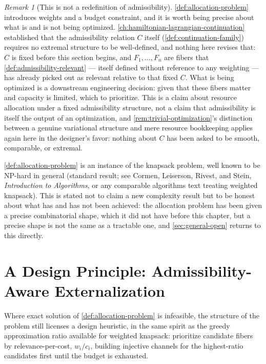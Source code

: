 \documentclass[11pt]{book}
\theoremstyle{plain}
\theoremstyle{definition}
\theoremstyle{remark}
\newtheorem{remark}[theorem]{Remark}
\begin{document}
\begin{remark}[This is not a redefinition of admissibility]
\label{rem:not-redefining-admissibility}
\cref{def:allocation-problem} introduces weights and a budget
constraint, and it is worth being precise about what is and is not
being optimized. \cref{ch:hamiltonian-lagrangian-continuation}
established that the admissibility relation $C$ itself
(\cref{def:continuation-family}) requires no extremal structure to be
well-defined, and nothing here revises that: $C$ is fixed before this
section begins, and $F_1, \dots, F_n$ are fibers that
\cref{def:admissibility-relevant} --- itself defined without reference
to any weighting --- has already picked out as relevant relative to
that fixed $C$. What is being optimized is a downstream engineering
decision: given that these fibers matter and capacity is limited,
which to prioritize. This is a claim about resource allocation under a
fixed admissibility structure, not a claim that admissibility is
itself the output of an optimization, and
\cref{rem:trivial-optimization}'s distinction between a genuine
variational structure and mere resource bookkeeping applies again
here in the designer's favor: nothing about $C$ has been asked to be
smooth, comparable, or extremal.
\end{remark}

\cref{def:allocation-problem} is an instance of the knapsack problem,
well known to be NP-hard in general (standard result; see Cormen,
Leiserson, Rivest, and Stein, \emph{Introduction to Algorithms}, or
any comparable algorithms text treating weighted knapsack). This is
stated not to claim a new complexity result but to be honest about
what has and has not been achieved: the allocation problem has been
given a precise combinatorial shape, which it did not have before this
chapter, but a precise shape is not the same as a tractable one, and
\cref{sec:general-open} returns to this directly.

\section{A Design Principle: Admissibility-Aware Externalization}

Where exact solution of \cref{def:allocation-problem} is infeasible,
the structure of the problem still licenses a design heuristic, in the
same spirit as the greedy approximation ratio available for weighted
knapsack: prioritize candidate fibers by relevance-per-cost, $w_i /
c_i$, building injective channels for the highest-ratio candidates
first until the budget is exhausted.
\end{document}
